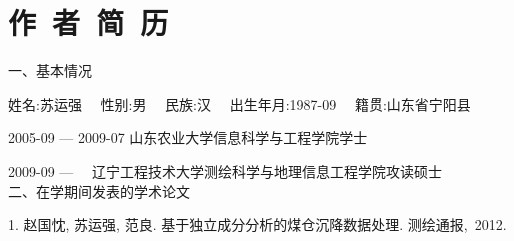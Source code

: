 
%
%

\chapter*{\hfill 作~者~简~历 \hfill}
\renewcommand{\labelenumi}{[\arabic{enumi}]}
一、基本情况

姓名:苏运强 ~~性别:男 ~~民族:汉 ~~出生年月:1987-09 ~~籍贯:山东省宁阳县

2005-09 — 2009-07 山东农业大学信息科学与工程学院学士 

2009-09 —         ~~辽宁工程技术大学测绘科学与地理信息工程学院攻读硕士\\

二、在学期间发表的学术论文

1. 赵国忱, 苏运强, 范良. 基于独立成分分析的煤仓沉降数据处理. 测绘通报,~2012.

